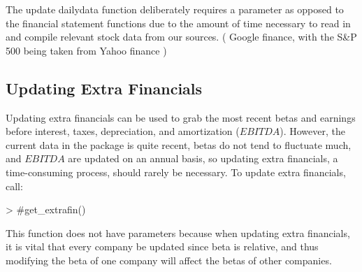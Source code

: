 \documentclass[12pt]{article}
\begin{document}
The update dailydata function deliberately requires a parameter as opposed to the financial statement functions due to the amount of time necessary to read in and compile relevant stock data from our sources. ( Google finance, with the S\&P 500 being taken from Yahoo finance )

\subsection*{Updating Extra Financials}
Updating extra financials can be used to grab the most recent betas and earnings before interest, taxes, depreciation, and amortization ($EBITDA$). However, the current data in the package is quite recent, betas do not tend to fluctuate much, and $EBITDA$ are updated on an annual basis, so updating extra financials, a time-consuming process, should rarely be necessary. To update extra financials, call:

\begin{Schunk}
\begin{Sinput}
> #get_extrafin()
\end{Sinput}
\end{Schunk}

This function does not have parameters because when updating extra financials, it is vital that every company be updated since beta is relative, and thus modifying the beta of one company will affect the betas of other companies. 
\end{document}
